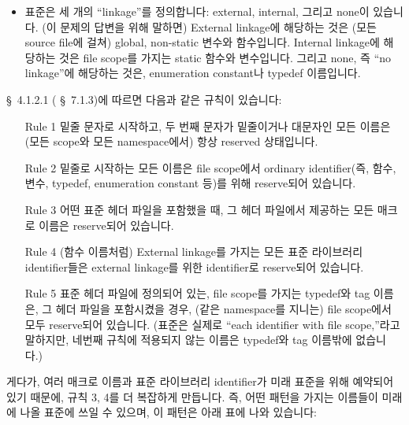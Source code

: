 \begin{faq}
\begin{itemize}
          \item 표준은 세 개의 ``linkage''를 정의합니다: external, internal,
            그리고 none이 있습니다. (이 문제의 답변을 위해 말하면) External
            linkage에 해당하는 것은 (모든 source file에 걸쳐) global, 
            non-static 변수와 함수입니다. Internal linkage에 해당하는 것은
            file scope를 가지는 static 함수와 변수입니다. 그리고 none,
            즉 ``no linkage''에 해당하는 것은, enumeration constant나
            typedef 이름입니다.
        \end{itemize}

        \cite{ansi} \S\ 4.1.2.1 (\cite{c89} \S\ 7.1.3)에 따르면 다음과 같은
        규칙이 있습니다:

        \begin{itemize}
          \item[Rule 1] 밑줄 문자로 시작하고, 두 번째 문자가 밑줄이거나
            대문자인 모든 이름은 (모든 scope와 모든 namespace에서) 항상
            reserved 상태입니다.
          \item[Rule 2] 밑줄로 시작하는 모든 이름은 file scope에서
            ordinary identifier(즉, 함수, 변수, typedef, enumeration constant
            등)를 위해 reserve되어 있습니다.
          \item[Rule 3] 어떤 표준 헤더 파일을 포함했을 때, 그 헤더 파일에서
            제공하는 모든 매크로 이름은 reserve되어 있습니다.
          \item[Rule 4] (함수 이름처럼) External linkage를 가지는 모든
            표준 라이브러리 identifier들은 external linkage를 위한
            identifier로 reserve되어 있습니다.
          \item[Rule 5] 표준 헤더 파일에 정의되어 있는, file scope를
            가지는 typedef와 tag 이름은, 그 헤더 파일을 포함시켰을 경우,
            (같은 namespace를 지니는) file scope에서 모두 reserve되어 있습니다. 
            (표준은 실제로 ``each identifier with file scope,''라고 말하지만,
            네번째 규칙에 적용되지 않는 이름은 typedef와 tag 이름밖에 없습니다.)
        \end{itemize}

        게다가, 여러 매크로 이름과 표준 라이브러리 identifier가 미래
        표준을 위해 예약되어 있기 때문에, 규칙 3, 4를 더 복잡하게 만듭니다.
        즉, 어떤 패턴을 가지는 이름들이 미래에 나올 표준에 쓰일 수 있으며,
        이 패턴은 아래 표에 나와 있습니다:


\end{faq}

